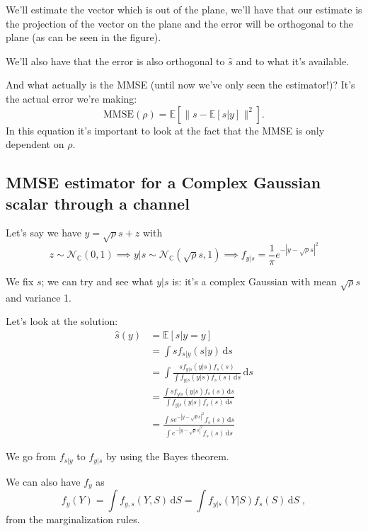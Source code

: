\documentclass[a4paper, 12pt]{book}
\begin{document}
We'll estimate the vector which is out of the plane, we'll have that our estimate is the projection of the vector on the plane and the error will be orthogonal to the plane (as can be seen in the figure).

We'll also have that the error is also orthogonal to $\hat{s}$ and to what it's available.

And what actually is the MMSE (until now we've only seen the estimator!)? It's the actual error we're making:
\begin{equation}
\text{MMSE}(\rho) = \mathbb{E}[\|s - \mathbb{E}[s|y]\|^2] \text{.} \tag{1.156}
\end{equation}
In this equation it's important to look at the fact that the MMSE is only dependent on $\rho$.

\subsection{MMSE estimator for a Complex Gaussian scalar through a channel}

Let's say we have $y = \sqrt{\rho}s + z$ with
$$
z \sim \mathcal{N}_{\mathbb{C}}(0,1) \implies y|s \sim \mathcal{N}_{\mathbb{C}}(\sqrt{\rho}s, 1) \implies f_{y|s} = \frac{1}{\pi} e^{-|y-\sqrt{\rho}s|^2}
$$

\begin{tcolorbox}[sharp corners, boxrule=0pt, leftrule=2pt, colframe=green!60!black, colback=green!5, left=5pt, top=3pt, bottom=3pt]
    We fix $s$; we can try and see what $y|s$ is: it's a complex Gaussian with mean $\sqrt{\rho}s$ and variance 1.
\end{tcolorbox}

Let's look at the solution:
\begin{align*}
\hat{s}(y) &= \mathbb{E}[s | y=y] \\
&= \int s f_{s|y}(s|y) \, \mathrm{d}s \\
&= \int \frac{s f_{y|s}(y|s) f_s(s)}{\int f_{y|s}(y|s) f_s(s) \, \mathrm{d}s} \, \mathrm{d}s \\
&= \frac{\int s f_{y|s}(y|s) f_s(s) \, \mathrm{d}s}{\int f_{y|s}(y|s) f_s(s) \, \mathrm{d}s} \\
&= \frac{\int s e^{-|y-\sqrt{\rho}s|^2} f_s(s) \, \mathrm{d}s}{\int e^{-|y-\sqrt{\rho}s|^2} f_s(s) \, \mathrm{d}s}
\end{align*}

\begin{tcolorbox}[sharp corners, boxrule=0pt, leftrule=2pt, colframe=green!60!black, colback=green!5, left=5pt, top=3pt, bottom=3pt]
    We go from $f_{s|y}$ to $f_{y|s}$ by using the Bayes theorem.
    
    We can also have $f_y$ as
    $$
    f_y(Y) = \int f_{y,s}(Y, S) \, \mathrm{d}S = \int f_{y|s}(Y|S) f_s(S) \, \mathrm{d}S \;,
    $$
    from the marginalization rules.
\end{tcolorbox}
\end{document}

